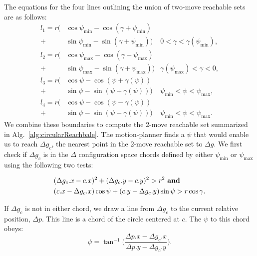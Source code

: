 The equations for the four lines outlining the union of  two-move reachable sets are as follows:
\begin{align}\label{eq:circlereachable}
l_1 =  r \Big(&\cos\psi_{\min}- \cos(\gamma + \psi_{\min} )\\ \nonumber
 + &\sin\psi_{\min}- \sin(\gamma + \psi_{\min})\Big) &  0<\gamma< \gamma(\psi_{\min}),\\ \nonumber
l_2 =  r \Big(&\cos\psi_{\max}- \cos(\gamma + \psi_{\max})\\ \nonumber
 + &\sin\psi_{\max}- \sin(\gamma + \psi_{\max})\Big) &  \gamma(\psi_{\max})<\gamma< 0,\\  \nonumber
l_3 =  r \Big(&\cos\psi- \cos( \psi+\gamma(\psi) )\\ \nonumber
+ & \sin\psi-\sin( \psi+ \gamma(\psi))\Big) &  \psi_{\min}<\psi< \psi_{\max},\\ \nonumber
l_4 =  r \Big(&\cos\psi- \cos( \psi-\gamma(\psi) )\\ \nonumber
+ &  \sin\psi- \sin( \psi- \gamma(\psi))\Big) &  \psi_{\min}<\psi< \psi_{\max}. \nonumber
\end{align}
We combine these boundaries to compute the 2-move reachable set summarized in Alg.~\ref{alg:circularReachbale}.
The  motion-planner finds a $\psi$ that would enable us to reach $\Delta g_c$, the nearest point in the 2-move reachable set to $\Delta g$. %
We first check if $\Delta g_c$ is in the $\Delta$ configuration space chords defined by either $\psi_{\min}$ or $\psi_{\max}$ using the following two tests: 

\begin{align}\label{eq:ifinchord}
&(\Delta g_c.x - c.x)^2 + (\Delta g_c.y - c.y)^2  > r^2 \textrm{     \textbf{and}}\\ \nonumber
 &( c.x-\Delta g_c.x ) \cos\psi + ( c.y-\Delta g_c.y) \sin\psi > r\cos\gamma.
\end{align}

 If $\Delta g_c$ is not in either chord, we draw a line from $\Delta g_c$ to the current relative position, $\Delta p$. This line is a chord of the circle centered at $c$. The $\psi$ to this chord obeys:
  \begin{equation}
 \psi = \tan^{-1}\Big(\frac{\Delta p.x - \Delta g_c.x}{\Delta p.y - \Delta g_c.y} \Big).
 \end{equation}
 
